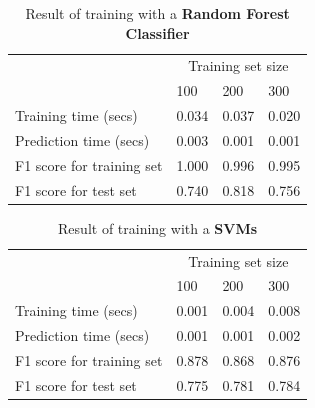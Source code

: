 \documentclass[twoside,openright,titlepage,numbers=noenddot,headinclude,%
               footinclude=true,cleardoublepage=empty,abstractoff,BCOR=5mm,%
               paper=a4,fontsize=11pt,ngerman,american]{scrreprt}
\numberwithin{theorem}{chapter}
\numberwithin{definition}{chapter}
\numberwithin{algorithm}{chapter}
\numberwithin{figure}{chapter}
\numberwithin{table}{chapter}
\numberwithin{equation}{chapter}
\begin{document}
\setlength{\extrarowheight}{1.5pt}
\begin{table}[!htbp]
\caption{Result of training with a \textbf{Random Forest Classifier}} %
\centering %
\begin{tabular}{|p{6cm}|p{1.5cm}|p{1.5cm}|p{1.5cm}|} %
\hline %
& \multicolumn{3}{c|}{Training set size}\\[5pt]
\cline{2-4} 
& 100 & 200 & 300\\[0.5ex]
\hline %

Training time (secs)          &  0.034&  0.037&  0.020\\ 
Prediction time (secs)        &  0.003&  0.001&  0.001\\ 
F1 score for training set     &  1.000&  0.996&  0.995\\ 
F1 score for test set         &  0.740&  0.818&  0.756\\ 
\hline %
\end{tabular}
\label{randomForestClassifierTable}
\end{table}


\setlength{\extrarowheight}{1.5pt}
\begin{table}[!htbp]
\caption{Result of training with a \textbf{SVMs}} %
\centering %
\begin{tabular}{|p{6cm}|p{1.5cm}|p{1.5cm}|p{1.5cm}|} %
\hline %
& \multicolumn{3}{c|}{Training set size}\\[5pt]
\cline{2-4} 
& 100 & 200 & 300\\[0.5ex]
\hline %

Training time (secs)          &  0.001&  0.004&  0.008\\ 
Prediction time (secs)        &  0.001&  0.001&  0.002\\ 
F1 score for training set     &  0.878&  0.868&  0.876\\ 
F1 score for test set         &  0.775&  0.781&  0.784\\
\hline %
\end{tabular}
\label{svmTable}
\end{table}
\end{document}
